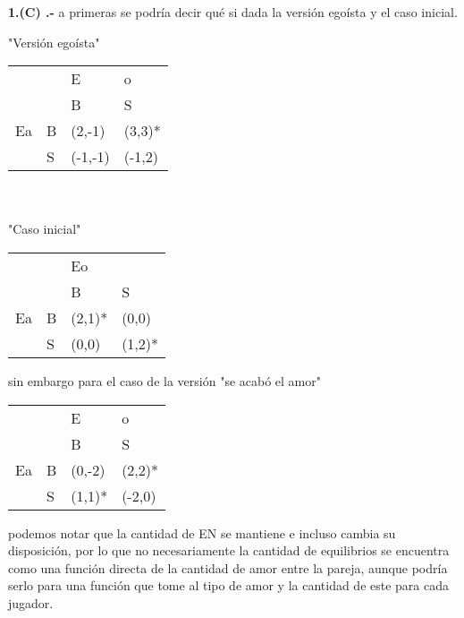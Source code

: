 \documentclass{homework}
\begin{document}
\textbf{1.(C) .-} a primeras se podría decir qué si dada la versión egoísta y el caso inicial.

\begin{center}
    "Versión egoísta"\\
    \begin{tabular}{llll}
 &  & E & o \\ \cline{3-4} 
 & \multicolumn{1}{l|}{} & \multicolumn{1}{l|}{B} & \multicolumn{1}{l|}{S} \\ \cline{2-4} 
\multicolumn{1}{l|}{Ea} & \multicolumn{1}{l|}{B} & \multicolumn{1}{l|}{(2,-1)} & \multicolumn{1}{l|}{(3,3)*} \\ \cline{2-4} 
\multicolumn{1}{l|}{} & \multicolumn{1}{l|}{S} & \multicolumn{1}{l|}{(-1,-1)} & \multicolumn{1}{l|}{(-1,2)} \\ \cline{2-4} 
\end{tabular}\\
\\

"Caso inicial"

    \begin{tabular}{llll}
 &  & Eo &  \\ \cline{3-4} 
 & \multicolumn{1}{l|}{} & \multicolumn{1}{l|}{B} & \multicolumn{1}{l|}{S} \\ \cline{2-4} 
\multicolumn{1}{l|}{Ea} & \multicolumn{1}{l|}{B} & \multicolumn{1}{l|}{(2,1)*} & \multicolumn{1}{l|}{(0,0)} \\ \cline{2-4} 
\multicolumn{1}{l|}{} & \multicolumn{1}{l|}{S} & \multicolumn{1}{l|}{(0,0)} & \multicolumn{1}{l|}{(1,2)*} \\ \cline{2-4} 
\end{tabular}
\end{center}

sin embargo para el caso de la versión "se acabó el amor" 
\begin{center}
\begin{tabular}{llll}
 &  & E & o \\ \cline{3-4} 
 & \multicolumn{1}{l|}{} & \multicolumn{1}{l|}{B} & \multicolumn{1}{l|}{S} \\ \cline{2-4} 
\multicolumn{1}{l|}{Ea} & \multicolumn{1}{l|}{B} & \multicolumn{1}{l|}{(0,-2)} & \multicolumn{1}{l|}{(2,2)*} \\ \cline{2-4} 
\multicolumn{1}{l|}{} & \multicolumn{1}{l|}{S} & \multicolumn{1}{l|}{(1,1)*} & \multicolumn{1}{l|}{(-2,0)} \\ \cline{2-4} 
\end{tabular}
\end{center}
podemos notar que la cantidad de EN se mantiene e incluso cambia su disposición, por lo que no necesariamente la cantidad de equilibrios se encuentra como una función directa de la cantidad de amor entre la pareja, aunque podría serlo para una función que tome al tipo de amor y la cantidad de este para cada jugador.
\end{document}
